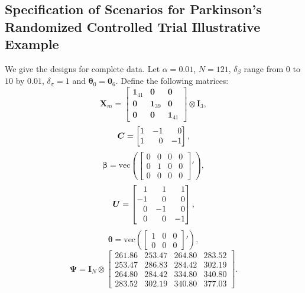 \documentclass[11pt]{article}
\begin{document}
\subsection{Specification of Scenarios for Parkinson's Randomized Controlled Trial Illustrative Example}
\label{giraffe}

We give the designs for complete data. Let $\alpha=0.01$, $N=121$, $\delta_{\beta}$ range from $0$ to $10$ by $0.01$, $\delta_{\sigma}=1$ and $\boldsymbol{\theta}_{0}=\boldsymbol{0}_{6}$. Define the following matrices:
\begin{equation}
\boldsymbol{X}_{m}=
\begin{bmatrix}
\boldsymbol{1}_{41}&\boldsymbol{0}&\boldsymbol{0}\\
\boldsymbol{0}&\boldsymbol{1}_{39}&\boldsymbol{0}\\
\boldsymbol{0}&\boldsymbol{0}&\boldsymbol{1}_{41}
\end{bmatrix}
\otimes\boldsymbol{I}_{3},
\end{equation}
\begin{equation}
\boldsymbol{C}=
\begin{bmatrix}
\hfill 1&\hfill-1&\hfill 0\\
\hfill 1&\hfill 0&\hfill-1
\end{bmatrix},
\end{equation}
\begin{equation}
\boldsymbol{\beta}=\text{vec}\left(
\begin{bmatrix}
0&0&0&0\\
0&1&0&0\\
0&0&0&0
\end{bmatrix}
'\right),
\end{equation}
\begin{equation}
\boldsymbol{U}=
\begin{bmatrix}
\hfill 1&\hfill 1&\hfill 1\\
\hfill-1&\hfill 0&\hfill 0\\
\hfill 0&\hfill-1&\hfill 0\\
\hfill 0&\hfill 0&\hfill-1
\end{bmatrix},
\end{equation}
\begin{equation}
\boldsymbol{\theta}=\text{vec}\left(
\begin{bmatrix}
1&0&0\\
0&0&0
\end{bmatrix}'\right),
\end{equation}
\begin{equation}
\boldsymbol{\Psi}=\boldsymbol{I}_{N}\otimes
\begin{bmatrix}
261.86&253.47&264.80&283.52\\
253.47&286.83&284.42&302.19\\
264.80&284.42&334.80&340.80\\
283.52&302.19&340.80&377.03
\end{bmatrix}
.
\end{equation}
\end{document}
